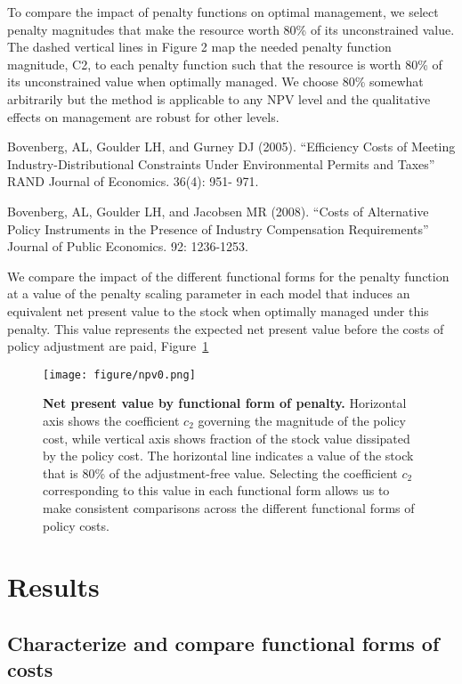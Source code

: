 \documentclass[authoryear, review, 12pt]{elsarticle}
\begin{document}
To compare the impact of penalty functions on optimal management, we select penalty magnitudes that make the resource worth 80\% of its unconstrained value.   The dashed vertical lines in Figure 2 map the needed penalty function magnitude, C2, to each penalty function such that the resource is worth 80\% of its unconstrained value when optimally managed.  We choose 80\% somewhat arbitrarily but the method is applicable to any NPV level and the qualitative effects on management are robust for other levels.  

Bovenberg, AL, Goulder LH, and Gurney DJ (2005).  “Efficiency Costs of Meeting Industry-Distributional  Constraints Under Environmental Permits and Taxes” RAND Journal of Economics. 36(4): 951-  971.

Bovenberg, AL, Goulder LH, and Jacobsen MR (2008).  “Costs of Alternative Policy Instruments in the    Presence of Industry Compensation Requirements” Journal of Public Economics. 92: 1236-1253.




We compare the impact of the different functional forms for the penalty
function at a value of the penalty scaling parameter in each model that
induces an equivalent net present value to the stock when optimally
managed under this penalty. This value represents the expected net
present value before the costs of policy adjustment are paid, Figure~\ref{fig:apples}

  \begin{figure}
    \begin{center}
\texttt{[image: figure/npv0.png]}
\caption{\textbf{Net present value by functional form of penalty.} Horizontal axis shows the coefficient $c_2$ governing the magnitude of the policy cost, while vertical axis shows fraction of the stock value dissipated by the policy cost.  The horizontal line indicates a value of the stock that is 80\% of the adjustment-free value. Selecting the coefficient $c_2$ corresponding to this value in each functional form allows us to make consistent comparisons across the different functional forms of policy costs.  }
\label{fig:apples}
\end{center}
\end{figure}


\section{Results}
\subsection{Characterize and compare functional forms of costs}
\end{document}
